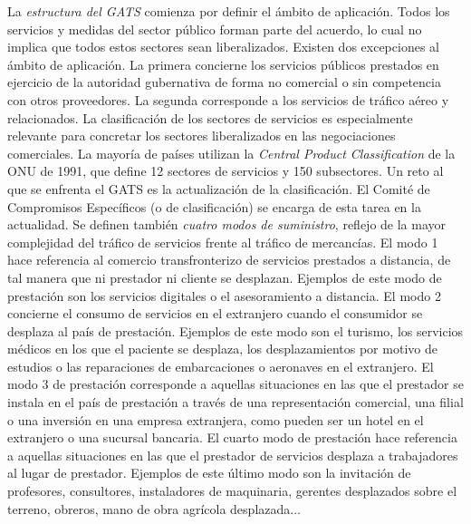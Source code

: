 \documentclass{nuevotema}
\begin{document}
La \textit{estructura del GATS} comienza por definir el ámbito de aplicación. Todos los servicios y medidas del sector público forman parte del acuerdo, lo cual no implica que todos estos sectores sean liberalizados. Existen dos excepciones al ámbito de aplicación. La primera concierne los servicios públicos prestados en ejercicio de la autoridad gubernativa de forma no comercial o sin competencia con otros proveedores. La segunda corresponde a los servicios de tráfico aéreo y relacionados. La clasificación de los sectores de servicios es especialmente relevante para concretar los sectores liberalizados en las negociaciones comerciales. La mayoría de países utilizan la \textit{Central Product Classification} de la ONU de 1991, que define 12 sectores de servicios y 150 subsectores. Un reto al que se enfrenta el GATS es la actualización de la clasificación. El Comité de Compromisos Específicos (o de clasificación) se encarga de esta tarea en la actualidad. Se definen también \textit{cuatro modos de suministro}, reflejo de la mayor complejidad del tráfico de servicios frente al tráfico de mercancías. El modo 1 hace referencia al comercio transfronterizo de servicios prestados a distancia, de tal manera que ni prestador ni cliente se desplazan. Ejemplos de este modo de prestación son los servicios digitales o el asesoramiento a distancia. El modo 2 concierne el consumo de servicios en el extranjero cuando el consumidor se desplaza al país de prestación. Ejemplos de este modo son el turismo, los servicios médicos en los que el paciente se desplaza, los desplazamientos por motivo de estudios o las reparaciones de embarcaciones o aeronaves en el extranjero. El modo 3 de prestación corresponde a aquellas situaciones en las que el prestador se instala en el país de prestación a través de una representación comercial, una filial o una inversión en una empresa extranjera, como pueden ser un hotel en el extranjero o una sucursal bancaria. El cuarto modo de prestación hace referencia a aquellas situaciones en las que el prestador de servicios desplaza a trabajadores al lugar de prestador. Ejemplos de este último modo son la invitación de profesores, consultores, instaladores de maquinaria, gerentes desplazados sobre el terreno, obreros, mano de obra agrícola desplazada... 
\end{document}
